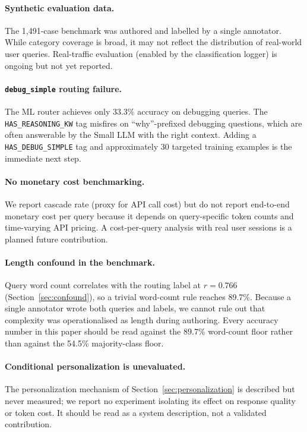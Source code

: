 \documentclass{article}
\begin{document}
\paragraph{Synthetic evaluation data.}
The 1,491-case benchmark was authored and labelled by a single annotator.
While category coverage is broad, it may not reflect the distribution of
real-world user queries. Real-traffic evaluation (enabled by the
classification logger) is ongoing but not yet reported.

\paragraph{\texttt{debug\_simple} routing failure.}
The ML router achieves only 33.3\% accuracy on debugging queries.
The \texttt{HAS\_REASONING\_KW} tag misfires on ``why''-prefixed debugging
questions, which are often answerable by the Small LLM with the right
context. Adding a \texttt{HAS\_DEBUG\_SIMPLE} tag and approximately 30
targeted training examples is the immediate next step.

\paragraph{No monetary cost benchmarking.}
We report cascade rate (proxy for API call cost) but do not report
end-to-end monetary cost per query because it depends on query-specific
token counts and time-varying API pricing. A cost-per-query analysis with
real user sessions is a planned future contribution.

\paragraph{Length confound in the benchmark.}
Query word count correlates with the routing label at $r = 0.766$
(Section~\ref{sec:confound}), so a trivial word-count rule reaches 89.7\%.
Because a single annotator wrote both queries and labels, we cannot rule out
that complexity was operationalised as length during authoring. Every accuracy
number in this paper should be read against the 89.7\% word-count floor rather
than against the 54.5\% majority-class floor.

\paragraph{Conditional personalization is unevaluated.}
The personalization mechanism of Section~\ref{sec:personalization} is
described but never measured; we report no experiment isolating its effect on
response quality or token cost. It should be read as a system description, not
a validated contribution.
\end{document}
